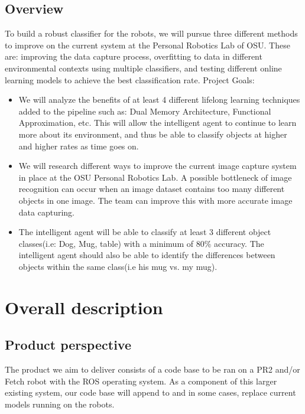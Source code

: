 \documentclass[draftclsnofoot, onecolumn, 10pt, compsoc]{IEEEtran}
\begin{document}
\subsection{Overview}
To build a robust classifier for the robots, we will pursue three different methods to improve on the current system at the Personal Robotics Lab of OSU. These are: improving the data capture process, overfitting to data in different environmental contexts using multiple classifiers, and testing different online learning models to achieve the best classification rate. Project Goals:
\begin{itemize}
\item We will analyze the benefits of at least 4 different lifelong learning techniques added to the pipeline such as: Dual Memory Architecture, Functional Approximation, etc. This will allow the intelligent agent to continue to learn more about its environment, and thus be able to classify objects at higher and higher rates as time goes on.
\item We will research different ways to improve the current image capture system in place at the OSU Personal Robotics Lab. A possible bottleneck of image recognition can occur when an image dataset contains too many different objects in one image. The team can improve this with more accurate image data capturing.
\item The intelligent agent will be able to classify at least 3 different object classes(i.e: Dog, Mug, table) with a minimum of 80\% accuracy. The intelligent agent should also be able to identify the differences between objects within the same class(i.e his mug vs. my mug).
\end{itemize}

\section{Overall description}
\subsection{Product perspective}
The product we aim to deliver consists of a code base to be ran on a PR2 and/or Fetch robot with the ROS operating system. As a component of this larger existing system, our code base will append to and in some cases, replace current models running on the robots.
\end{document}
